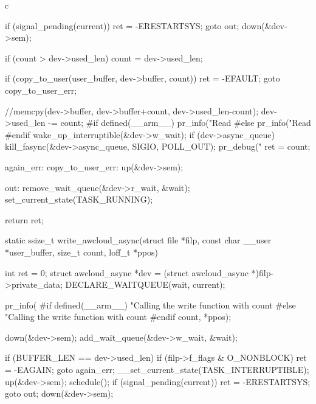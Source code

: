 \begin{code-block}{c}
{{                if (signal_pending(current)) {
                        ret = -ERESTARTSYS;
                        goto out;
                }
                down(&dev->sem);
        }

        if (count > dev->used_len) {
                count = dev->used_len;
        }

        if (copy_to_user(user_buffer, dev->buffer, count)) {
                ret = -EFAULT;
                goto copy_to_user_err;
        }

        //memcpy(dev->buffer, dev->buffer+count, dev->used_len-count);
        dev->used_len -= count;
#if defined(__arm__)
        pr_info("Read %
#else
        pr_info("Read %
#endif
        wake_up_interruptible(&dev->w_wait);
        if (dev->async_queue) {
                kill_fasync(&dev->async_queue, SIGIO, POLL_OUT);
                pr_debug("%
        }
        ret = count;

again_err:
copy_to_user_err:
        up(&dev->sem);

out:
        remove_wait_queue(&dev->r_wait, &wait);
        set_current_state(TASK_RUNNING);

        return ret;
}

static ssize_t write_awcloud_async(struct file *filp,
        const char __user *user_buffer, size_t count, loff_t *ppos)
{
        int ret = 0;
        struct awcloud_async *dev = (struct awcloud_async *)filp->private_data;
        DECLARE_WAITQUEUE(wait, current);

        pr_info(
#if defined(__arm__)
                "Calling the write function with count %
#else
                "Calling the write function with count %
#endif
                count, *ppos);

        down(&dev->sem);
        add_wait_queue(&dev->w_wait, &wait);

        if (BUFFER_LEN == dev->used_len) {
                if (filp->f_flags & O_NONBLOCK) {
                        ret = -EAGAIN;
                        goto again_err;
                }
                __set_current_state(TASK_INTERRUPTIBLE);
                up(&dev->sem);
                schedule();
                if (signal_pending(current)) {
                        ret = -ERESTARTSYS;
                        goto out;
                }
                down(&dev->sem);
        }

}
\end{code-block}
